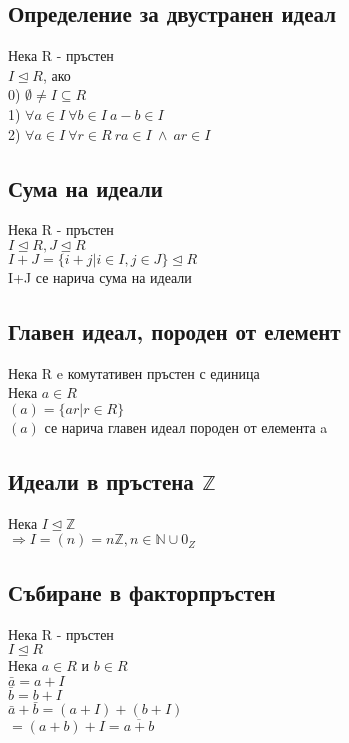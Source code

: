 \documentclass[12pt]{article}
\begin{document}
\subsection{Определение за двустранен идеал}
Нека R - пръстен \\
$I \trianglelefteq R$, ако \\
0) $\emptyset \neq I \subseteq R$ \\
1) $\forall a \in I \ \forall b \in I \ a-b \in I$ \\
2) $\forall a \in I \ \forall r \in R \ ra \in I \ \land \ ar \in I$

\subsection{Сума на идеали}
Нека R - пръстен \\
$I \trianglelefteq R, J \trianglelefteq R$ \\
$I+J = \{i+j \vert i \in I, j \in J\} \trianglelefteq R$\\
I+J се нарича сума на идеали

\subsection{Главен идеал, породен от елемент}
Нека R e комутативен пръстен с единица \\
Нека $a \in R$ \\
$(a) = \{ar \vert r \in R\}$ \\
$(a)$ се нарича главен идеал породен от елемента a

\subsection{Идеали в пръстена $\mathbb{Z}$}
Нека $I \trianglelefteq \mathbb{Z}$ \\
$\Rightarrow I = (n) = n\mathbb{Z}, n \in \mathbb{N} \cup {0_Z}$

\subsection{Събиране в факторпръстен}
Нека R - пръстен\\
$I \trianglelefteq R$ \\
Нека $a \in R$ и $b \in R$ \\
$\bar{a} = a + I$\\
$\bar{b} = b + I$\\
$\bar{a} + \bar{b} = (a+I)+(b+I)$ \\
$=(a+b)+I=\overline{a+b}$
\end{document}
